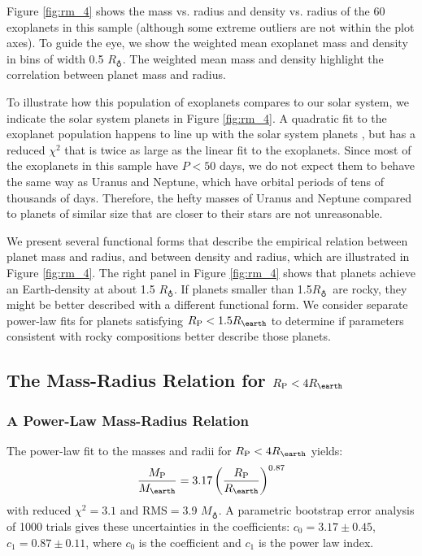 \documentclass[iop]{emulateapj}
\newcommand{\rpl}{\ensuremath{R_{\rm P}}}
\newcommand{\mpl}{\ensuremath{M_{\rm P}}}
\newcommand{\rearth}{\ensuremath{R_\earth}}
\newcommand{\mearth}{\ensuremath{M_\earth}}
\newcommand{\rspecial}{4 \rearth}
\begin{document}
Figure \ref{fig:rm_4} shows the mass vs. radius and density vs. radius of the 60 exoplanets in this sample (although some extreme outliers are not within the plot axes).  To guide the eye, we show the weighted mean exoplanet mass and density in bins of width 0.5 \rearth.  The weighted mean mass and density highlight the correlation between planet mass and radius.  

To illustrate how this population of exoplanets compares to our solar system, we indicate the solar system planets in Figure \ref{fig:rm_4}.  A quadratic fit to the exoplanet population happens to line up with the solar system planets \citep{Lissauer2011}, but has a reduced $\chi^2$ that is twice as large as the linear fit to the exoplanets.  Since most of the exoplanets in this sample have $P < 50$ days, we do not expect them to behave the same way as Uranus and Neptune, which have orbital periods of tens of thousands of days.  Therefore, the hefty masses of Uranus and Neptune compared to planets of similar size that are closer to their stars are not unreasonable.

We present several functional forms that describe the empirical relation between planet mass and radius, and between density and radius, which are illustrated in Figure \ref{fig:rm_4}.  The right panel in Figure \ref{fig:rm_4} shows that planets achieve an Earth-density at about 1.5 \rearth.  If planets smaller than 1.5\rearth\ are rocky, they might be better described with a different functional form.  We consider separate power-law fits for planets satisfying $\rpl < 1.5 \rearth$ to determine if parameters consistent with rocky compositions better describe those planets.

\subsection{The Mass-Radius Relation for $\rpl < \rspecial$}
\subsubsection{A Power-Law Mass-Radius Relation}
The power-law fit to the masses and radii for $\rpl < \rspecial$ yields:
\begin{equation}
\frac{\mpl}{\mearth} = 3.17 \left(\frac{\rpl}{\rearth}\right)^{0.87}
\label{eqn:mr_plaw}
\end{equation}
with reduced $\chi^2=3.1$ and RMS$=$3.9 \mearth.  A parametric bootstrap error analysis of 1000 trials gives these uncertainties in the coefficients: $c_0 = 3.17 \pm 0.45$, $c_1 = 0.87\pm 0.11$, where $c_0$ is the coefficient and $c_1$ is the power law index.
\end{document}
